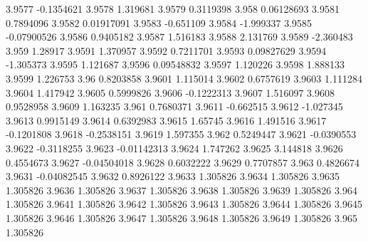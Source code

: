 3.9577  -0.1354621
3.9578  1.319681
3.9579  0.3119398
3.958  0.06128693
3.9581  0.7894096
3.9582  0.01917091
3.9583  -0.651109
3.9584  -1.999337
3.9585  -0.07900526
3.9586  0.9405182
3.9587  1.516183
3.9588  2.131769
3.9589  -2.360483
3.959  1.28917
3.9591  1.370957
3.9592  0.7211701
3.9593  0.09827629
3.9594  -1.305373
3.9595  1.121687
3.9596  0.09548832
3.9597  1.120226
3.9598  1.888133
3.9599  1.226753
3.96  0.8203858
3.9601  1.115014
3.9602  0.6757619
3.9603  1.111284
3.9604  1.417942
3.9605  0.5999826
3.9606  -0.1222313
3.9607  1.516097
3.9608  0.9528958
3.9609  1.163235
3.961  0.7680371
3.9611  -0.662515
3.9612  -1.027345
3.9613  0.9915149
3.9614  0.6392983
3.9615  1.65745
3.9616  1.491516
3.9617  -0.1201808
3.9618  -0.2538151
3.9619  1.597355
3.962  0.5249447
3.9621  -0.0390553
3.9622  -0.3118255
3.9623  -0.01142313
3.9624  1.747262
3.9625  3.144818
3.9626  0.4554673
3.9627  -0.04504018
3.9628  0.6032222
3.9629  0.7707857
3.963  0.4826674
3.9631  -0.04082545
3.9632  0.8926122
3.9633  1.305826
3.9634  1.305826
3.9635  1.305826
3.9636  1.305826
3.9637  1.305826
3.9638  1.305826
3.9639  1.305826
3.964  1.305826
3.9641  1.305826
3.9642  1.305826
3.9643  1.305826
3.9644  1.305826
3.9645  1.305826
3.9646  1.305826
3.9647  1.305826
3.9648  1.305826
3.9649  1.305826
3.965  1.305826
